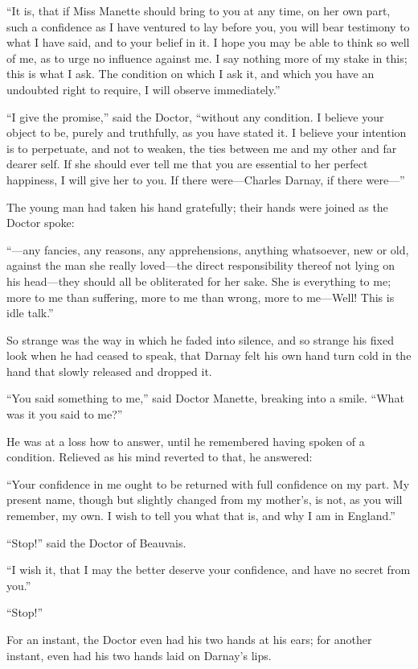 ``It is, that if Miss Manette should bring to you at any time, on her
own part, such a confidence as I have ventured to lay before you,
you will bear testimony to what I have said, and to your belief in it.
I hope you may be able to think so well of me, as to urge no influence
against me. I say nothing more of my stake in this; this is what I ask.
The condition on which I ask it, and which you have an undoubted right
to require, I will observe immediately.''

``I give the promise,'' said the Doctor, ``without any condition.
I believe your object to be, purely and truthfully, as you have
stated it.  I believe your intention is to perpetuate, and not to
weaken, the ties between me and my other and far dearer self.  If she
should ever tell me that you are essential to her perfect happiness,
I will give her to you.  If there were---Charles Darnay, if there were---''

The young man had taken his hand gratefully; their hands were joined
as the Doctor spoke:

``---any fancies, any reasons, any apprehensions, anything whatsoever,
new or old, against the man she really loved---the direct responsibility
thereof not lying on his head---they should all be obliterated for her
sake.  She is everything to me; more to me than suffering, more to me
than wrong, more to me---Well!  This is idle talk.''

So strange was the way in which he faded into silence, and so strange
his fixed look when he had ceased to speak, that Darnay felt his own
hand turn cold in the hand that slowly released and dropped it.

``You said something to me,'' said Doctor Manette, breaking into a smile.
``What was it you said to me?''

He was at a loss how to answer, until he remembered having spoken of
a condition.  Relieved as his mind reverted to that, he answered:

``Your confidence in me ought to be returned with full confidence on
my part.  My present name, though but slightly changed from my
mother's, is not, as you will remember, my own.  I wish to tell you
what that is, and why I am in England.''

``Stop!'' said the Doctor of Beauvais.

``I wish it, that I may the better deserve your confidence, and have
no secret from you.''

``Stop!''

For an instant, the Doctor even had his two hands at his ears; for
another instant, even had his two hands laid on Darnay's lips.

